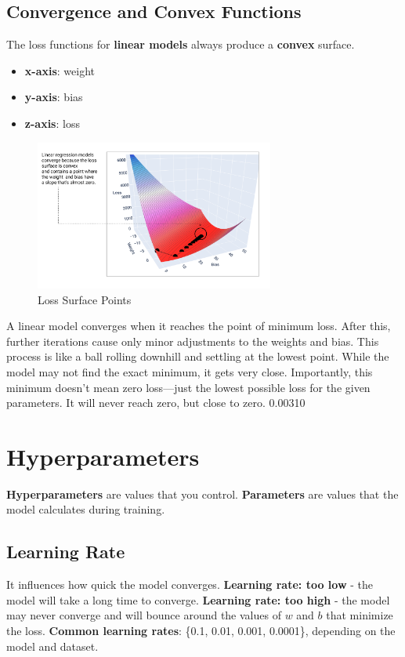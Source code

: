 \documentclass[a4paper,12pt]{article}
\begin{document}
\subsection{Convergence and Convex Functions}
The loss functions for \textbf{linear models} always produce a \textbf{convex} surface. 
\begin{itemize}
    \item \textbf{x-axis}: weight
    \item \textbf{y-axis}: bias 
    \item \textbf{z-axis}: loss 
\end{itemize}
\begin{figure}[H]
    \centering
    \includegraphics[width=0.7\textwidth]{../Images/Linear-Regression/loss-surface-points.png}
    \caption{Loss Surface Points}
    \label{fig:loss-surface}
\end{figure}

A linear model converges when it reaches the point of minimum loss. After this, further iterations cause only minor adjustments to the weights and bias. This process is like a ball rolling downhill and settling at the lowest point. While the model may not find the exact minimum, it gets very close. Importantly, this minimum doesn't mean zero loss—just the lowest possible loss for the given parameters. It will never reach zero, but close to zero. 0.00310

\section{Hyperparameters}
\textbf{Hyperparameters} are values that you control. \textbf{Parameters} are values that the model calculates during training.

\subsection{Learning Rate}
It influences how quick the model converges. \newline
\textbf{Learning rate: too low} - the model will take a long time to converge. \newline
\textbf{Learning rate: too high} - the model may never converge and will bounce around the values of $w$ and $b$ that minimize the loss. \newline
\textbf{Common learning rates}: \{0.1, 0.01, 0.001, 0.0001\}, depending on the model and dataset.
\end{document}
